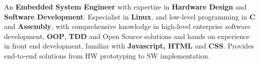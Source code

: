 \nohyphens{\justify
An \textbf{Embedded System Engineer} with expertize in \textbf{Hardware Design} and \textbf{Software Development}. Especialist in \textbf{Linux},
and low-level programming in \textbf{C} and \textbf{Assembly}, with comprehensive knowlodge in high-level
enterprise software development, \textbf{OOP}, \textbf{TDD} and Open Source solutions and hands on experience in front end development,
familiar with \textbf{Javascript, HTML} and \textbf{CSS}. Provides end-to-end solutions from HW prototyping to SW implementation.
}
